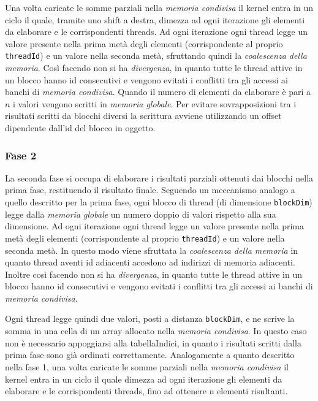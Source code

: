 \documentclass[a4paper]{article}   %
\begin{document}
Una volta caricate le somme parziali nella \emph{memoria condivisa} il kernel entra in un ciclo il quale, tramite uno shift a destra, dimezza ad ogni iterazione gli elementi da elaborare e le corrispondenti threads.
Ad ogni iterazione ogni thread legge un valore presente nella prima metà degli elementi (corrispondente al proprio {\tt threadId}) e un valore nella seconda metà, sfruttando quindi la \emph{coalescenza della memoria}. Così facendo non si ha \emph{divergenza}, in quanto tutte le thread attive in un blocco hanno id consecutivi e vengono evitati i conflitti tra gli accessi ai banchi di \emph{memoria condivisa}.
Quando il numero di elementi da elaborare è pari a $n$ i valori vengono scritti in \emph{memoria globale}. Per evitare sovrapposizioni tra i risultati scritti da blocchi diversi la scrittura avviene utilizzando un offset dipendente dall’id del blocco in oggetto.

\subsubsection{Fase 2}
La seconda fase si occupa di elaborare i risultati parziali ottenuti dai blocchi nella prima fase, restituendo il risultato finale. 
Seguendo un meccanismo analogo a quello descritto per la prima fase, ogni blocco di thread (di dimensione {\tt blockDim}) legge dalla \emph{memoria globale} un numero doppio di valori rispetto alla sua dimensione. 
Ad ogni iterazione ogni thread legge un valore presente nella prima metà degli elementi (corrispondente al proprio {\tt threadId}) e un valore nella seconda metà. In questo modo viene sfruttata la \emph{coalescenza della memoria} in quanto thread aventi id adiacenti accedono ad indirizzi di memoria adiacenti. Inoltre così facendo non si ha \emph{divergenza}, in quanto tutte le thread attive in un blocco hanno id consecutivi e vengono evitati i conflitti tra gli accessi ai banchi di \emph{memoria condivisa}.

Ogni thread legge quindi due valori, posti a distanza {\tt blockDim}, e ne scrive la somma in una cella di un array allocato nella \emph{memoria condivisa}. In questo caso non è necessario appoggiarsi alla tabellaIndici, in quanto i risultati scritti dalla prima fase sono già ordinati correttamente.
Analogamente a quanto descritto nella fase 1, una volta caricate le somme parziali nella \emph{memoria condivisa} il kernel entra in un ciclo il quale dimezza ad ogni iterazione gli elementi da elaborare e le corrispondenti threads, fino ad ottenere n elementi risultanti. 
\end{document}
